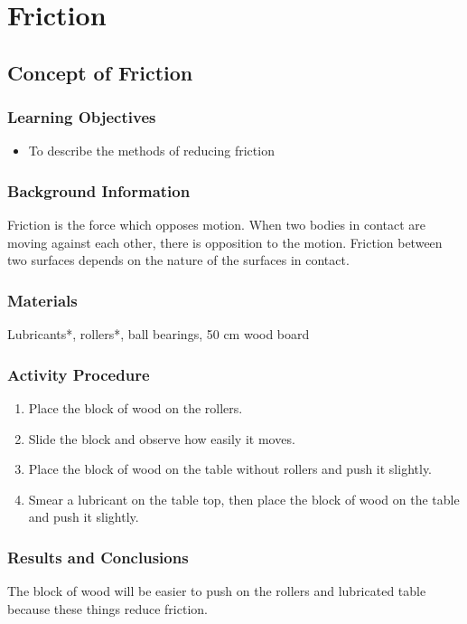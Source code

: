 \section{Friction}

\subsection{Concept of Friction}

\subsubsection*{Learning Objectives}
\begin{itemize}
\item{To describe the methods of reducing friction} 
\end{itemize}

\subsubsection*{Background Information}
Friction is the force which opposes motion.  When two bodies in contact are moving against each other, there is opposition to the motion.  Friction between two surfaces depends on the nature of the surfaces in contact.

\subsubsection*{Materials}
Lubricants*, rollers*, ball bearings, 50 cm wood board

\subsubsection*{Activity Procedure}
\begin{enumerate}
\item{Place the block of wood on the rollers.} 
\item{Slide the block and observe how easily it moves.} 
\item{Place the block of wood on the table without rollers and push it slightly.} 
\item{Smear a lubricant on the table top, then place the block of wood on the table and push it slightly.} 
\end{enumerate}

\subsubsection*{Results and Conclusions}
The block of wood will be easier to push on the rollers and lubricated table because these things reduce friction.  

